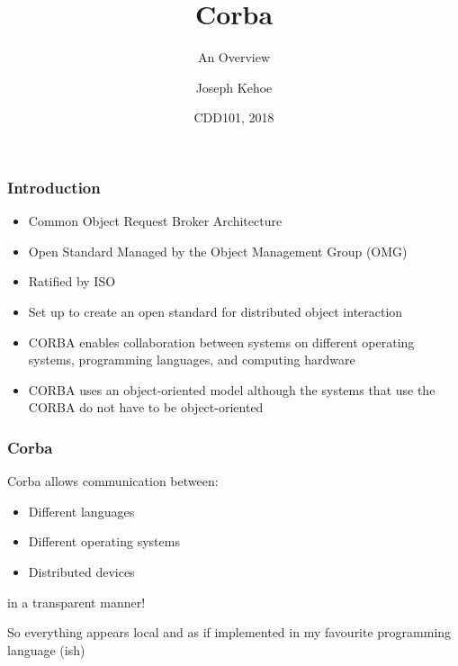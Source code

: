 \documentclass{beamer}
\title[CORBA] %
{Corba}
\subtitle{An Overview}
\author[Dr. Joseph Kehoe] %
{Joseph Kehoe\inst{1}}
\institute[IT Carlow] %
{
	\inst{1}%
	Department of Computing and Networking\\
	Institute of Technology Carlow
}
\date[ITC 2018] %
{CDD101, 2018}
\begin{document}
 
\frame{\titlepage}
 
 


  \begin{frame}
  	\frametitle{Introduction}

  	\begin{itemize}
  		\item Common Object Request Broker Architecture
  		\item Open Standard Managed by the Object Management Group (OMG)
  		\item Ratified by ISO
  		\item Set up to create an open standard for distributed object interaction
  		\item CORBA enables collaboration between systems on different operating systems, programming languages, and computing hardware
  		\item CORBA uses an object-oriented model although the systems that use the CORBA do not have to be object-oriented
  	\end{itemize}

  	
  \end{frame}
  
    \begin{frame}
    	\frametitle{Corba}
    	Corba allows communication between:
    	\begin{itemize}
    		\item Different languages
    		\item Different operating systems
    		\item Distributed devices
    		
    	\end{itemize}
    	in a transparent manner!
    	
    	So everything appears local and as if implemented in my favourite programming language (ish)
    \end{frame}
 
\end{document}
